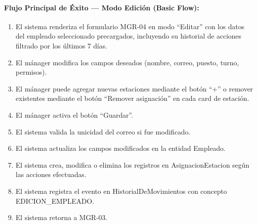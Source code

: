 \paragraph{Flujo Principal de Éxito --- Modo Edición (Basic Flow):}
\begin{enumerate}
    \item[I.] El sistema renderiza el formulario MGR-04 en modo ``Editar'' con los datos del empleado seleccionado precargados, incluyendo su historial de acciones filtrado por los últimos 7 días.
    \item[II.] El mánager modifica los campos deseados (nombre, correo, puesto, turno, permisos).
    \item[III.] El mánager puede agregar nuevas estaciones mediante el botón ``+'' o remover existentes mediante el botón ``Remover asignación'' en cada card de estación.
    \item[IV.] El mánager activa el botón ``Guardar''.
    \item[V.] El sistema valida la unicidad del correo si fue modificado.
    \item[VI.] El sistema actualiza los campos modificados en la entidad Empleado.
    \item[VII.] El sistema crea, modifica o elimina los registros en AsignacionEstacion según las acciones efectuadas.
    \item[VIII.] El sistema registra el evento en HistorialDeMovimientos con concepto EDICION\_EMPLEADO.
    \item[IX.] El sistema retorna a MGR-03.
\end{enumerate}

